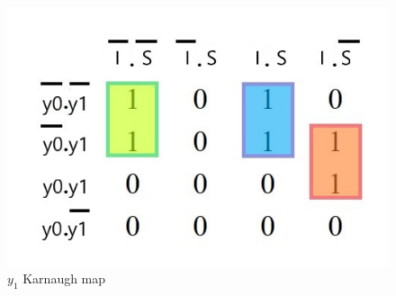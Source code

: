 \documentclass[../../e3_tp3_main.tex]{subfiles}
\begin{document}
\begin{figure}[H]
	\centering
	\includegraphics[scale=0.8]{figures/e3_tp3_ej1_mealy_y1_kmap.jpg}
	\caption{$y_1$ Karnaugh map}
\end{figure}
\end{document}
